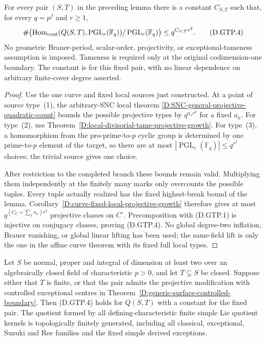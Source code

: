 \begin{theorem}
\label{D:global-original-boundary-projective-growth}
For every pair $(S,T)$ in the preceding lemma there is a
constant $C_{S,T}$ such that, for every $q=p^f$ and $r\ge1$,
\[
 \#\bigl(\operatorname{Hom}_{\rm cont}
       (Q(S,T),\operatorname{PGL}_r(\mathbb F_q))
                    /\operatorname{PGL}_r(\mathbb F_q)\bigr)
                           \le q^{C_{S,T}r^2}.
                                                        \tag{D.GTP.4}
\]
No geometric Brauer-period, scalar-order, projectivity, or
exceptional-tameness assumption is imposed. Tameness is required
only at the original codimension-one boundary. The constant is
for this fixed pair, with no linear dependence on arbitrary
finite-cover degree asserted.
\end{theorem}

\begin{proof}
Use the one curve and fixed local sources just constructed.
At a point of source type~(1), the arbitrary-SNC local theorem
\ref{D:SNC-general-projective-quadratic-count} bounds the possible
projective types by $q^{a_xr^2}$ for a fixed $a_x$.
For type~(2), use
Theorem~\ref{D:local-divisorial-tame-projective-growth}.
For type~(3), a homomorphism from the pro-prime-to-$p$ cyclic
group is determined by one prime-to-$p$ element of the target,
so there are at most
$|\operatorname{PGL}_r(\mathbb F_q)|\le q^{r^2}$ choices;
the trivial source gives one choice.

After restriction to the completed branch these bounds remain
valid. Multiplying them independently at the finitely many
marks only overcounts the possible tuples. Every tuple actually
realized has the fixed highest-break bound of the lemma.
Corollary~\ref{D:curve-fixed-local-projective-growth} therefore
gives at most $q^{(C_C+\sum_xa_x)r^2}$ projective classes on
$C^\circ$. Precomposition with (D.GTP.1) is injective on
conjugacy classes, proving (D.GTP.4). No global degree-two
inflation, Brauer vanishing, or global linear lifting has been
used; the same-field lift is only the one in the affine curve
theorem with its fixed full local types.
\end{proof}

\begin{corollary}
\label{D:global-tame-projective-controlled-closure}
Let $S$ be normal, proper and integral of dimension at least two
over an algebraically closed field of characteristic $p>0$,
and let $T\subsetneq S$ be closed. Suppose either that $T$ is
finite, or that the pair admits the projective modification
with controlled exceptional centres in
Theorem~\ref{D:generic-surface-controlled-boundary}.
Then (D.GTP.4) holds for $Q(S,T)$ with a constant for the fixed
pair. The quotient formed by all defining-characteristic finite
simple Lie quotient kernels is topologically finitely generated,
including all classical, exceptional, Suzuki and Ree families
and the fixed simple derived exceptions.
\end{corollary}


